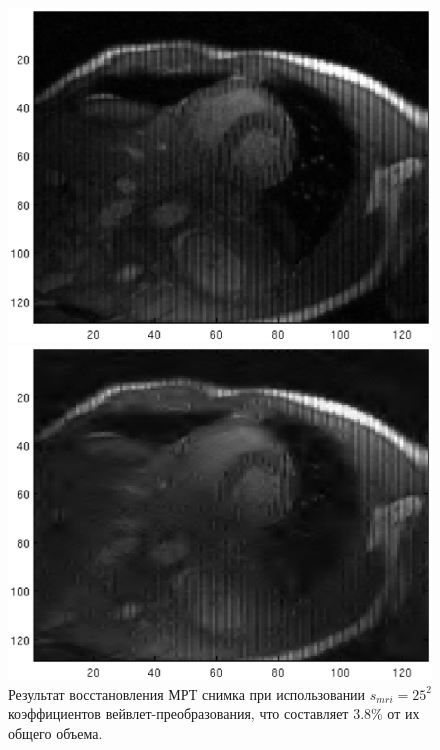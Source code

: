\documentclass[14pt]{matmex-diploma-custom}
\begin{document}
\begin{figure}[tbp]
  \centering
  \begin{minipage}[b]{0.45\textwidth}
    \includegraphics[width=\textwidth]{pics_eps/coef_rtv_src_img_128.eps}
  \end{minipage}
  \hfill
  \begin{minipage}[b]{0.45\textwidth}
    \includegraphics[width=\textwidth]{pics_eps/coef_rtv_result_img_128.eps}
  \end{minipage}
    \caption{\small Результат восстановления МРТ снимка при использовании $s_{mri}=25^2$ коэффициентов вейвлет-преобразования, что составляет 3.8\% от их общего объема.}
    \label{fig:dwt_result_on_real}
\end{figure}
\end{document}
